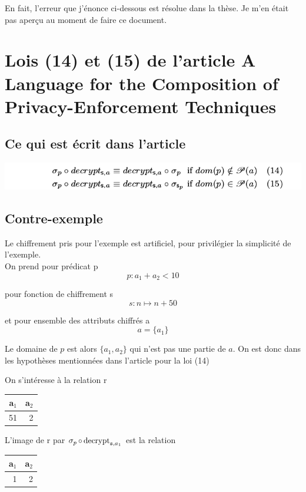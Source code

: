 \documentclass[french]{article}
\DeclareMathOperator{\sel}{\sigma}
\DeclareMathOperator{\decrypt}{decrypt}
\newcommand\typeT[1]{\text{\ttfamily #1}}
\newcommand{\decryptArgs}[2]{\decrypt_{\typeT{#1}, #2}}
\begin{document}
En fait, l'erreur que j'énonce ci-dessous est résolue dans la thèse.
Je m'en était pas aperçu au moment de faire ce document.

\section*{Lois (14) et (15) de l'article A Language for the Composition of Privacy-Enforcement Techniques}
\subsection*{Ce qui est écrit dans l'article}
\includegraphics[width = .9\textwidth]{lois14-15.png}

\subsection*{Contre-exemple}
Le chiffrement pris pour l'exemple est artificiel, pour privilégier la simplicité de l'exemple. \\

On prend pour prédicat p 
$$p: a_1 + a_2 < 10$$ 

pour fonction de chiffrement s
$$ s: n \mapsto n + 50 $$

et pour ensemble des attributs chiffrés a
$$ a = \{a_1\} $$

Le domaine de $p$ est alors $\{a_1, a_2\}$
qui n'est pas une partie de $a$.
On est donc dans les hypothèses mentionnées
dans l'article pour la loi (14)

On s'intéresse à la relation r
\begin{center}
	\begin{tabular}{rr}
		a\(_{\text{1}}\) & a\(_{\text{2}}\)\\
		\hline
		51 & 2\\
	\end{tabular}
\end{center}

L'image de r par
$\sel_p \circ \decryptArgs{s}{a_1}$
est la relation
\begin{center}
	\begin{tabular}{rr}
		a\(_{\text{1}}\) & a\(_{\text{2}}\)\\
		\hline
		1 & 2\\
	\end{tabular}
\end{center}
\end{document}
